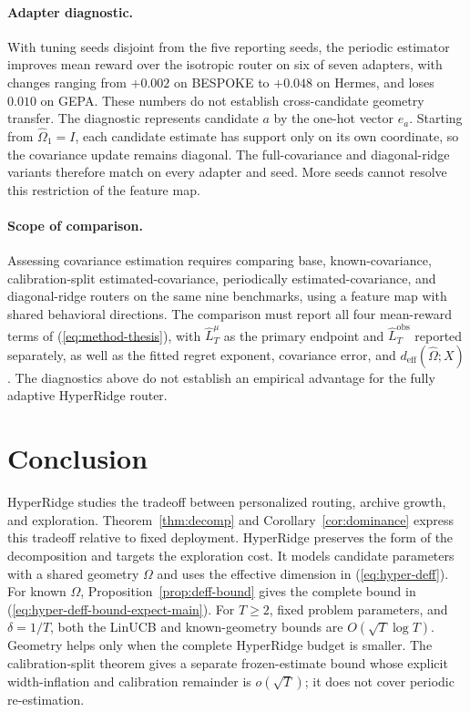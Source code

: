 \documentclass{article} %
\renewcommand{\eqref}[1]{\textup{(\ref{#1})}}
\begin{document}
\paragraph{Adapter diagnostic.}
With tuning seeds disjoint from the five reporting seeds, the periodic estimator improves mean reward over the isotropic router on six of seven adapters, with changes ranging from $+0.002$ on BESPOKE to $+0.048$ on Hermes, and loses $0.010$ on GEPA. These numbers do not establish cross-candidate geometry transfer. The diagnostic represents candidate $a$ by the one-hot vector $e_a$. Starting from $\widehat{\Omega}_1=I$, each candidate estimate has support only on its own coordinate, so the covariance update remains diagonal. The full-covariance and diagonal-ridge variants therefore match on every adapter and seed. More seeds cannot resolve this restriction of the feature map.

\paragraph{Scope of comparison.}
Assessing covariance estimation requires comparing base, known-covariance, calibration-split
estimated-covariance, periodically estimated-covariance, and diagonal-ridge
routers on the same nine benchmarks, using a feature map with shared behavioral
directions. The comparison must report all four mean-reward terms of
\eqref{eq:method-thesis}, with \(\widehat L_T^\mu\) as the primary endpoint
and \(\widehat L_T^{\mathrm{obs}}\) reported separately, as well as the fitted
regret exponent, covariance error, and
\(d_{\mathrm{eff}}(\widehat\Omega;X)\). The diagnostics above do not establish
an empirical advantage for the fully adaptive HyperRidge router.

\section{Conclusion}

\label{sec:conclusion}

HyperRidge studies the tradeoff between personalized routing, archive growth,
and exploration. Theorem~\ref{thm:decomp} and Corollary~\ref{cor:dominance}
express this tradeoff relative to fixed deployment.
HyperRidge preserves the form of the decomposition and targets the
exploration cost. It models candidate parameters with a shared geometry
\(\Omega\) and uses the effective dimension in \eqref{eq:hyper-deff}.
For known \(\Omega\), Proposition~\ref{prop:deff-bound} gives the complete
bound in \eqref{eq:hyper-deff-bound-expect-main}. For \(T\ge2\), fixed problem
parameters, and \(\delta=1/T\), both the LinUCB and known-geometry bounds are
\(O(\sqrt{T}\log T)\). Geometry helps only when the complete HyperRidge budget
is smaller. The calibration-split theorem gives a separate frozen-estimate
bound whose explicit width-inflation and calibration remainder is
\(o(\sqrt T)\); it does not cover periodic re-estimation.
\end{document}
